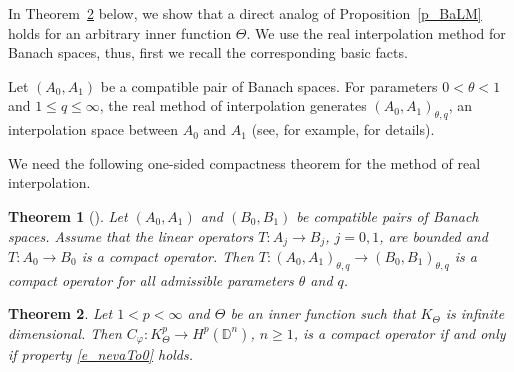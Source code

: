 \documentclass{amsart}
\numberwithin{equation}{section}
\newtheorem{theorem}{Theorem}[section]
\theoremstyle{definition}
\newcommand{\diin}{\Theta}
\newcommand{\cph}{C_\varphi}
\newcommand{\dn}{\mathbb{D}^n}
\begin{document}
In Theorem~\ref{t_comp_KTp1} below, we show that
a direct analog of Proposition~\ref{p_BaLM}
holds for an arbitrary inner function $\diin$.
We use the real interpolation method for Banach spaces,
thus, first we recall the corresponding basic facts.

Let $(A_0, A_1)$ be a compatible pair of Banach spaces.
For parameters $0< \theta < 1$ and  $1\le q \le \infty$, the real method of interpolation
generates $(A_0, A_1)_{\theta, q}$, an interpolation space between $A_0$ and $A_1$
(see, for example, \cite[Chapter~3]{BL76} for details).

We need the following one-sided compactness theorem for the method of real interpolation.

\begin{theorem}[\cite{Cw92}]\label{t_cmpIntrp_Cw}
Let $(A_0, A_1)$ and $(B_0, B_1)$ be compatible pairs of Banach spaces.
Assume that the linear operators $T: A_j \to B_j$, $j=0, 1$, are bounded and
$T:A_0 \to B_0$ is a compact operator.
Then $T: (A_0, A_1)_{\theta, q}  \to (B_0, B_1)_{\theta, q}$ is a compact operator for all admissible
parameters $\theta$ and $q$.
\end{theorem}



\begin{theorem}\label{t_comp_KTp1}
Let $1<p<\infty$ and $\diin$ be an inner function such that $K_\diin$ is infinite dimensional.
Then $\cph: K^p_\diin \to H^p(\dn)$, $n\ge 1$, is a compact operator if and only if
property \eqref{e_nevaTo0} holds.
\end{theorem}
\end{document}
